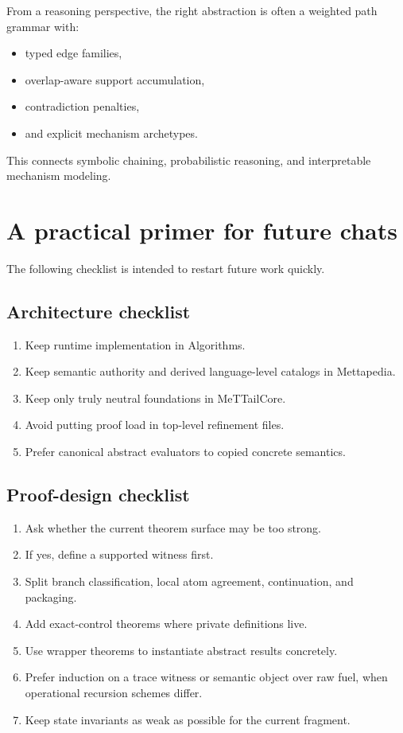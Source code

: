 \documentclass[11pt]{article}
\begin{document}
From a reasoning perspective, the right abstraction is often a weighted path grammar with:

\begin{itemize}
  \item typed edge families,
  \item overlap-aware support accumulation,
  \item contradiction penalties,
  \item and explicit mechanism archetypes.
\end{itemize}

This connects symbolic chaining, probabilistic reasoning, and interpretable mechanism modeling.

\section{A practical primer for future chats}

The following checklist is intended to restart future work quickly.

\subsection{Architecture checklist}

\begin{enumerate}
  \item Keep runtime implementation in Algorithms.
  \item Keep semantic authority and derived language-level catalogs in Mettapedia.
  \item Keep only truly neutral foundations in MeTTailCore.
  \item Avoid putting proof load in top-level refinement files.
  \item Prefer canonical abstract evaluators to copied concrete semantics.
\end{enumerate}

\subsection{Proof-design checklist}

\begin{enumerate}
  \item Ask whether the current theorem surface may be too strong.
  \item If yes, define a supported witness first.
  \item Split branch classification, local atom agreement, continuation, and packaging.
  \item Add exact-control theorems where private definitions live.
  \item Use wrapper theorems to instantiate abstract results concretely.
  \item Prefer induction on a trace witness or semantic object over raw fuel, when operational recursion schemes differ.
  \item Keep state invariants as weak as possible for the current fragment.
\end{enumerate}
\end{document}
